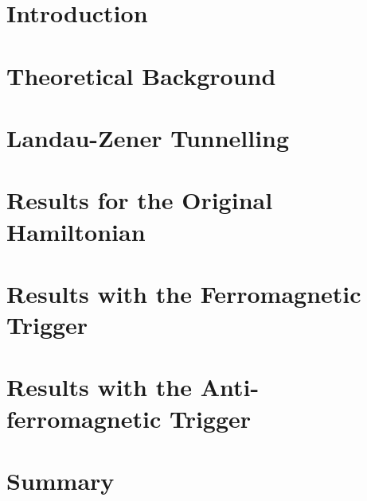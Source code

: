 \documentclass[12]{book}
\begin{document}
 



\tableofcontents
\chapter{Introduction}


\chapter{Theoretical Background}
 


 
\chapter{Landau-Zener Tunnelling}
 

 
\chapter{Results for the Original Hamiltonian}
 

 
\chapter{Results with the Ferromagnetic Trigger}
 


\chapter{Results with the Anti-ferromagnetic Trigger}
 


\chapter{Summary}






\end{document}
